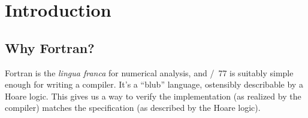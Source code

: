 \section{Introduction}

\subsection{Why Fortran?}
Fortran is the \emph{lingua franca} for numerical analysis, and \FORTRAN/~77
is suitably simple enough for writing a compiler. It's a ``blub''
language, ostensibly describable by a Hoare logic. This gives us a way
to verify the implementation (as realized by the compiler) matches the
specification (as described by the Hoare logic).
